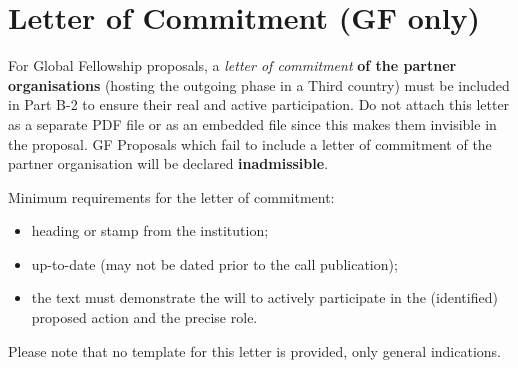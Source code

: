 \newpage
\section{Letter of Commitment (GF only)}
\label{sec:letters}

For Global Fellowship proposals, a {\em letter of commitment} \textbf{of the partner
organisations} (hosting the outgoing phase in a Third country) must be included in Part
B-2 to ensure their real and active participation. 
Do not attach this letter as a separate PDF file or as an
embedded file since this makes them invisible in the proposal. GF Proposals which fail to
include a letter of commitment of the partner organisation will be declared \textbf{inadmissible}.

\medskip\noindent
Minimum requirements for the letter of commitment:

\begin{itemize}
  \item heading or stamp from the institution;
  \item up-to-date (may not be dated prior to the call publication);
  \item the text must demonstrate the will to actively participate in the (identified) proposed action and the precise role.
\end{itemize}

\noindent
Please note that no template for this letter is provided, only general indications.

